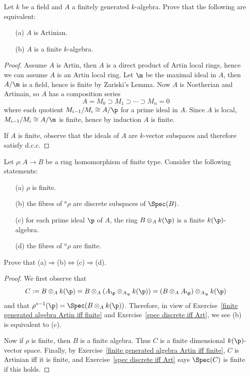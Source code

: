 \begin{exercise}\label{finite generated algebra Artin iff finite}
Let $k$ be a field and $A$ a finitely generated $k$-algebra. Prove that the following are equivalent:
\begin{itemize}
\item[(a)] $A$ is Artinian.
\item[(b)] $A$ is a finite $k$-algebra.
\end{itemize}
\end{exercise}
\begin{proof}
Assume $A$ is Artin, then $A$ is a direct product of Artin local rings, hence we can assume $A$ is an Artin local ring. Let $\m$ be the maximal ideal in $A$, then $A/\m$ is a field, hence is finite by Zariski's Lemma. Now $A$ is Noetherian and Artinain, so $A$ has a composition series
\[A=M_0\supset M_1\supset\cdots\supset M_n=0\]
where each quotient $M_{i-1}/M_i\cong A/\p$ for a prime ideal in $A$. Since $A$ is local, $M_{i-1}/M_i\cong A/\m$ is finite, hence by induction $A$ is finite.\par
If $A$ is finite, observe that the ideals of $A$ are $k$-vector subspaces and therefore satisfy d.c.c.
\end{proof}
\begin{exercise}
Let $\rho:A\to B$ be a ring homomorphism of finite type. Consider the following
statements:
\begin{itemize}
\item[(a)] $\rho$ is finite.
\item[(b)] the fibres of $^{a}\!\rho$ are discrete subspaces of $\Spec(B)$.
\item[(c)] for each prime ideal $\p$ of $A$, the ring $B\otimes_Ak(\p)$ is a finite $k(\p)$-algebra.
\item[(d)] the fibres of $^{a}\!\rho$ are finite.
\end{itemize}
Prove that (a)$\Rightarrow$(b)$\Leftrightarrow$(c)$\Rightarrow$(d).
\end{exercise}
\begin{proof}
We first observe that
\[C:=B\otimes_Ak(\p)=B\otimes_A(A_\p\otimes_{A_\p}k(\p))=(B\otimes_AA_\p)\otimes_{A_\p}k(\p)\]
and that $\rho^{*-1}(\p)=\Spec(B\otimes_Ak(\p))$. Therefore, in view of Exercise~\ref{finite generated algebra Artin iff finite} and Exercise~\ref{spec discrete iff Art}, we see (b) is equivalent to (c).\par
Now if $\rho$ is finite, then $B$ is a finite algebra. Thus $C$ is a finite dimensional $k(\p)$-vector space. Finally, by Exercise~\ref{finite generated algebra Artin iff finite}, $C$ is Artinian iff it is finite, and Exercise~\ref{spec discrete iff Art} says $\Spec(C)$ is finite if this holds.
\end{proof}
